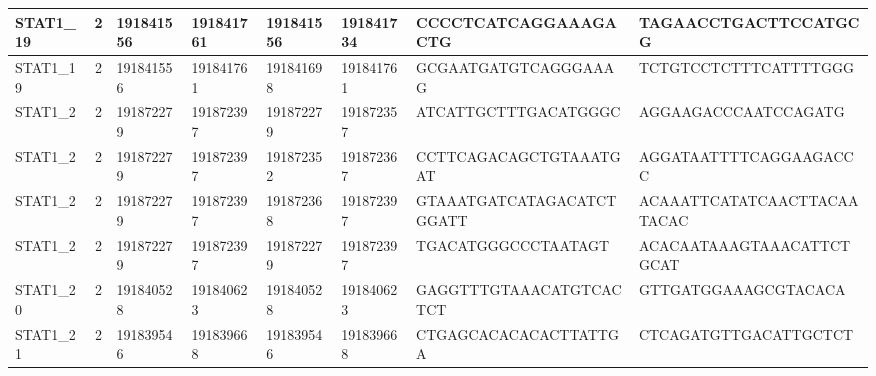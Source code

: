 \begin{landscape}
\begin{longtable}{| p{} | p{} | p{} | p{} | p{} | p{} | p{} | p{} |}
\multicolumn{1}{|l|}{STAT1\_19}  & \multicolumn{1}{c|}{2}  & \multicolumn{1}{l|}{191841556} & \multicolumn{1}{l|}{191841761} & \multicolumn{1}{l|}{191841556} & \multicolumn{1}{l|}{191841734} & \multicolumn{1}{l|}{CCCCTCATCAGGAAAGACTG}            & \multicolumn{1}{l|}{TAGAACCTGACTTCCATGCG}          \\ \hline
\multicolumn{1}{|l|}{STAT1\_19}  & \multicolumn{1}{c|}{2}  & \multicolumn{1}{l|}{191841556} & \multicolumn{1}{l|}{191841761} & \multicolumn{1}{l|}{191841698} & \multicolumn{1}{l|}{191841761} & \multicolumn{1}{l|}{GCGAATGATGTCAGGGAAAG}            & \multicolumn{1}{l|}{TCTGTCCTCTTTCATTTTGGG}         \\ \hline
\multicolumn{1}{|l|}{STAT1\_2}   & \multicolumn{1}{c|}{2}  & \multicolumn{1}{l|}{191872279} & \multicolumn{1}{l|}{191872397} & \multicolumn{1}{l|}{191872279} & \multicolumn{1}{l|}{191872357} & \multicolumn{1}{l|}{ATCATTGCTTTGACATGGGC}            & \multicolumn{1}{l|}{AGGAAGACCCAATCCAGATG}          \\ \hline
\multicolumn{1}{|l|}{STAT1\_2}   & \multicolumn{1}{c|}{2}  & \multicolumn{1}{l|}{191872279} & \multicolumn{1}{l|}{191872397} & \multicolumn{1}{l|}{191872352} & \multicolumn{1}{l|}{191872367} & \multicolumn{1}{l|}{CCTTCAGACAGCTGTAAATGAT}          & \multicolumn{1}{l|}{AGGATAATTTTCAGGAAGACCC}        \\ \hline
\multicolumn{1}{|l|}{STAT1\_2}   & \multicolumn{1}{c|}{2}  & \multicolumn{1}{l|}{191872279} & \multicolumn{1}{l|}{191872397} & \multicolumn{1}{l|}{191872368} & \multicolumn{1}{l|}{191872397} & \multicolumn{1}{l|}{GTAAATGATCATAGACATCTGGATT}       & \multicolumn{1}{l|}{ACAAATTCATATCAACTTACAATACAC}   \\ \hline
\multicolumn{1}{|l|}{STAT1\_2}   & \multicolumn{1}{c|}{2}  & \multicolumn{1}{l|}{191872279} & \multicolumn{1}{l|}{191872397} & \multicolumn{1}{l|}{191872279} & \multicolumn{1}{l|}{191872397} & \multicolumn{1}{l|}{TGACATGGGCCCTAATAGT}             & \multicolumn{1}{l|}{ACACAATAAAGTAAACATTCTGCAT}     \\ \hline
\multicolumn{1}{|l|}{STAT1\_20}  & \multicolumn{1}{c|}{2}  & \multicolumn{1}{l|}{191840528} & \multicolumn{1}{l|}{191840623} & \multicolumn{1}{l|}{191840528} & \multicolumn{1}{l|}{191840623} & \multicolumn{1}{l|}{GAGGTTTGTAAACATGTCACTCT}         & \multicolumn{1}{l|}{GTTGATGGAAAGCGTACACA}          \\ \hline
\multicolumn{1}{|l|}{STAT1\_21}  & \multicolumn{1}{c|}{2}  & \multicolumn{1}{l|}{191839546} & \multicolumn{1}{l|}{191839668} & \multicolumn{1}{l|}{191839546} & \multicolumn{1}{l|}{191839668} & \multicolumn{1}{l|}{CTGAGCACACACACTTATTGA}           & \multicolumn{1}{l|}{CTCAGATGTTGACATTGCTCT}         \\ \hline

\end{longtable}
\end{landscape}
